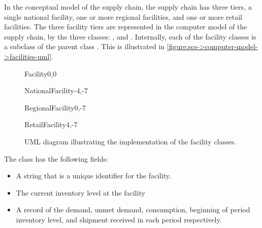 In the conceptual model of the supply chain,
the supply chain has three tiers,
a single national facility,
one or more regional facilities,
and one or more retail facilities.
The three facility tiers are represented
in the computer model of the supply chain,
by the three classes:
,  and .
Internally, each of the facility classes
is a subclass of the parent class .
This is illustrated in
\autoref{figure:scs->computer-model->facilities-uml}.

\begin{figure}[h!]
\centering
\begin{myuml}
  \begin{abstractclass}[text width=8cm]{Facility}{0,0}
  \end{abstractclass}

  \begin{class}[text width=3cm]{NationalFacility}{-4,-7}
  \end{class}

  \begin{class}[text width=3cm]{RegionalFacility}{0,-7}
  \end{class}

  \begin{class}[text width=3cm]{RetailFacility}{4,-7}
  \end{class}
\end{myuml}
\caption{UML diagram illustrating the implementation of the facility classes.}
\label{figure:scs->computer-model->facilities-uml}
\end{figure}


The  class has the following fields:
\begin{itemize}
\item {}
A string that is a unique identifier for the facility.
\item {}
The current inventory level at the facility
\item {}
A record of the demand, unmet demand, consumption,
beginning of period inventory level,
and shipment received in each period respectively.
\end{itemize}



